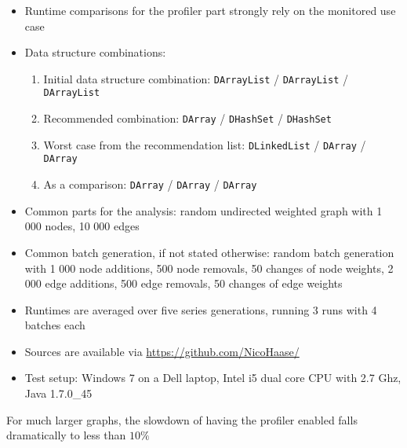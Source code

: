 	\begin{itemize}
		\item Runtime comparisons for the profiler part strongly rely on the monitored use
			case
		\item Data structure combinations:
		\begin{enumerate}
			\item Initial data structure combination: \texttt{DArrayList} / \texttt{DArrayList} /
			\texttt{DArrayList}
			\item Recommended combination: \texttt{DArray} / \texttt{DHashSet} / \texttt{DHashSet}
			\item Worst case from the recommendation list:
				\texttt{DLinkedList} / \texttt{DArray} / \texttt{DArray}
			\item As a comparison: \texttt{DArray} / \texttt{DArray} / \texttt{DArray}
		\end{enumerate}

		\item Common parts for the analysis: random undirected weighted graph with 1 000 nodes,
			10 000 edges
		\item Common batch generation, if not stated otherwise: random batch generation with
			1 000 node additions, 500 node removals, 50 changes of node weights, 2 000 edge
			additions, 500 edge removals, 50 changes of edge weights
		\item Runtimes are averaged over five series generations, running 3 runs with 4 batches
			each
		\item Sources are available via \url{https://github.com/NicoHaase/}
		\item Test setup: Windows 7 on a Dell laptop, Intel i5 dual core CPU with 2.7 Ghz, Java
			1.7.0\_45
	\end{itemize}	
	
	For much larger graphs, the slowdown of having the profiler enabled falls dramatically to
	less than $10 \%$
	
	\FloatBarrier
